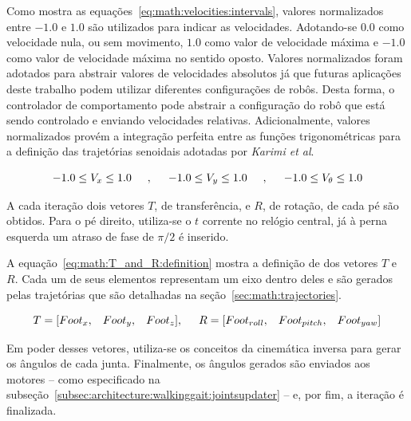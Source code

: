 Como mostra as equações~\ref{eq:math:velocities:intervals}, valores normalizados entre $-1.0$ e $1.0$ são utilizados para indicar as velocidades. Adotando-se $0.0$ como velocidade nula, ou sem movimento, $1.0$ como valor de velocidade máxima e $-1.0$ como valor de velocidade máxima no sentido oposto. Valores normalizados foram adotados para abstrair valores de velocidades absolutos já que futuras aplicações deste trabalho podem utilizar diferentes configurações de robôs. Desta forma, o controlador de comportamento pode abstrair a configuração do robô que está sendo controlado e enviando velocidades relativas. Adicionalmente, valores normalizados provém a integração perfeita entre as funções trigonométricas para a definição das trajetórias senoidais adotadas por \textit{Karimi et al}.

\begin{equation}
\label{eq:math:velocities:intervals}
-1.0 \leq V_x \leq 1.0
\hspace{5mm},\hspace{5mm}
-1.0 \leq V_y \leq 1.0
\hspace{5mm},\hspace{5mm}
-1.0 \leq V_\theta \leq 1.0
\end{equation}

A cada iteração dois vetores $T$, de transferência, e $R$, de rotação, de cada pé são obtidos. Para o pé direito, utiliza-se o $t$ corrente no relógio central, já à perna esquerda um atraso de fase de $\pi/2$ é inserido.

A equação~\ref{eq:math:T_and_R:definition} mostra a definição de dos vetores $T$ e $R$. Cada um de seus elementos representam um eixo dentro deles e são gerados pelas trajetórias que são detalhadas na seção~\ref{sec:math:trajectories}.

\begin{equation}
\label{eq:math:T_and_R:definition}
T = [Foot_x,\hspace{3mm}Foot_y,\hspace{3mm}Foot_z],\hspace{5mm}R = [Foot_{roll},\hspace{3mm}Foot_{pitch},\hspace{3mm}Foot_{yaw}]
\end{equation}

Em poder desses vetores, utiliza-se os conceitos da cinemática inversa para gerar os ângulos de cada junta. Finalmente, os ângulos gerados são enviados aos motores -- como especificado na subseção~\ref{subsec:architecture:walkinggait:jointsupdater} -- e, por fim, a iteração é finalizada.

